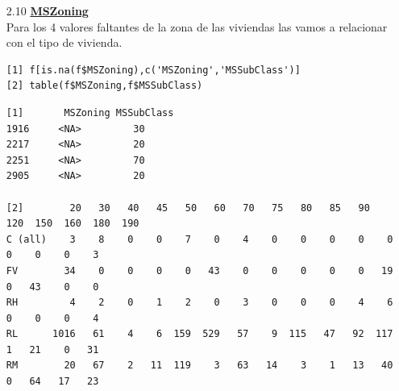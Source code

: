 \documentclass{report}
\begin{document}
\begin{itemize}
\begin{itemize}
\begin{itemize}
\begin{lstlisting}[frame=single]
V<-f[which(is.na(f$MasVnrType) | is.na(f$MasVnrArea)),c('MasVnrType','MasVnrArea')]
\end{lstlisting}
\vspace{2mm}

Notamos que en la fila 2611 existe un área de fachada de 198 pero que no tiene un tipo, para esto saquemos la mediana de las áreas de los tipos de fachada y le asociamos a la que mejor se ajuste.\\

\begin{lstlisting}[frame=single]
V1<-f[order(f$MasVnrType),c('MasVnrType','MasVnrArea')]
V2<-V1[!is.na(V1$MasVnrType),]
V3<-aggregate(V2[,2],list(V2$MasVnrType),median)
V3
\end{lstlisting}
\vspace{2mm}
Asi las medianas de la área de cada tipo de fachada viene dado por.\\

\begin{lstlisting}[frame=single]
  Group.1   x
1  BrkCmn 161
2 BrkFace 203
3    None   0
4   Stone 200
\end{lstlisting}
\vspace{2mm}

Así como el área de la fachada es de 198 le asociamos la fachada de tipo Stone.\\
\begin{lstlisting}[frame=single]
f[2611,'MasVnrType']<-'Stone'
\end{lstlisting}
\vspace{2mm}

\item[2.10] \textbf{\underline{MSZoning}}\\

Para los 4 valores faltantes de la zona de las viviendas las vamos a relacionar con el tipo de vivienda.\\

\begin{lstlisting}[frame=single]
[1] f[is.na(f$MSZoning),c('MSZoning','MSSubClass')]
[2] table(f$MSZoning,f$MSSubClass)
\end{lstlisting}

\begin{lstlisting}[frame=single]
[1]       MSZoning MSSubClass
1916     <NA>         30
2217     <NA>         20
2251     <NA>         70
2905     <NA>         20

[2]        20   30   40   45   50   60   70   75   80   85   90  120  150  160  180  190
C (all)    3    8    0    0    7    0    4    0    0    0    0    0    0    0    0    3
FV        34    0    0    0    0   43    0    0    0    0    0   19    0   43    0    0
RH         4    2    0    1    2    0    3    0    0    0    4    6    0    0    0    4
RL      1016   61    4    6  159  529   57    9  115   47   92  117    1   21    0   31
RM        20   67    2   11  119    3   63   14    3    1   13   40    0   64   17   23
\end{lstlisting}


\end{itemize}
\end{itemize}
\end{itemize}
\end{document}
